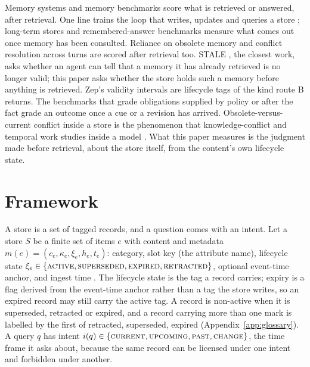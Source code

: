 \documentclass{article}
\begin{document}
Memory systems and memory benchmarks score what is retrieved or answered, after retrieval.
One line trains the loop that writes, updates and queries a store \citep{automem,supersede}; long-term stores \citep{packer2023,zhong2024,zhang2025survey,mem0,amem} and remembered-answer benchmarks \citep{longmemeval,locomo} measure what comes out once memory has been consulted.
Reliance on obsolete memory \citep{memora} and conflict resolution across turns \citep{memoryagentbench} are scored after retrieval too.
STALE \citep{stale}, the closest work, asks whether an agent can tell that a memory it has already retrieved is no longer valid; this paper asks whether the store holds such a memory before anything is retrieved.
Zep's validity intervals \citep{zep} are lifecycle tags of the kind route B returns.
The benchmarks that grade obligations supplied by policy or after the fact \citep{nissenbaum2004,cimemories,maini2024,gatemem,pmbench,hushbench,statemembench} grade an outcome once a cue or a revision has arrived.
Obsolete-versus-current conflict inside a store is the phenomenon that knowledge-conflict and temporal work studies inside a model \citep{xu2024conflicts,longpre2021,dhingra2022}.
What this paper measures is the judgment made before retrieval, about the store itself, from the content's own lifecycle state.

\section{Framework}\label{sec:framework}

A store is a set of tagged records, and a question comes with an intent.
Let a store $S$ be a finite set of items $e$ with content and metadata $m(e)=(c_e,\kappa_e,\xi_e,h_e,t_e)$: category, slot key (the attribute name), lifecycle state $\xi_e\in\{\textsc{active},\textsc{superseded},\textsc{expired},\textsc{retracted}\}$, optional event-time anchor, and ingest time \citep{fr}.
The lifecycle state is the tag a record carries; expiry is a flag derived from the event-time anchor rather than a tag the store writes, so an expired record may still carry the active tag.
A record is non-active when it is superseded, retracted or expired, and a record carrying more than one mark is labelled by the first of retracted, superseded, expired (Appendix~\ref{app:glossary}).
A query $q$ has intent $i(q)\in\{\textsc{current},\textsc{upcoming},\textsc{past},\textsc{change}\}$, the time frame it asks about, because the same record can be licensed under one intent and forbidden under another.
\end{document}
